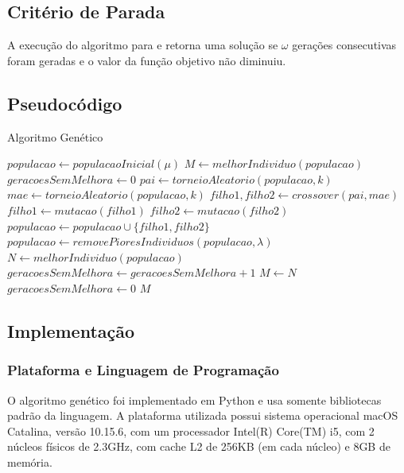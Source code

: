 \documentclass{article}
\begin{document}
\subsection{Critério de Parada}
\quad A execução do algoritmo para e retorna uma solução se $\omega$ gerações consecutivas foram geradas e o valor da função objetivo não diminuiu.

\subsection{Pseudocódigo}
\begin{algorithm}[H]
\caption{Algoritmo Genético}
\begin{algorithmic}

\STATE $populacao \leftarrow populacaoInicial(\mu)$
\STATE $M \leftarrow melhorIndividuo(populacao)$
\STATE $geracoesSemMelhora \leftarrow 0$
\STATE $pai \leftarrow torneioAleatorio(populacao, k)$
\STATE $mae \leftarrow torneioAleatorio(populacao, k)$
\STATE $filho1, filho2 \leftarrow crossover(pai, mae)$
\STATE $filho1 \leftarrow mutacao(filho1)$
\ENDIF
{}
\STATE $filho2 \leftarrow mutacao(filho2)$
\ENDIF
\STATE $populacao \leftarrow populacao \cup \{filho1, filho2\}$
\ENDFOR
\STATE $populacao \leftarrow removePioresIndividuos(populacao, \lambda) $
\STATE $N \leftarrow melhorIndividuo(populacao)$
\STATE $geracoesSemMelhora \leftarrow geracoesSemMelhora + 1$
\ELSE
\STATE $M \leftarrow N$
\STATE $geracoesSemMelhora \leftarrow 0$
\ENDIF
\ENDWHILE
\RETURN $M$
\end{algorithmic}
\end{algorithm}


\subsection{Implementação}

\subsubsection{Plataforma e Linguagem de Programação}
\quad O algoritmo genético foi implementado em Python e usa somente bibliotecas padrão da linguagem.  A plataforma utilizada possui sistema operacional macOS Catalina, versão 10.15.6, com um
processador Intel(R) Core(TM) i5, com 2 núcleos físicos de 2.3GHz, com cache L2 de 256KB (em cada núcleo) e 8GB de memória.
\end{document}
